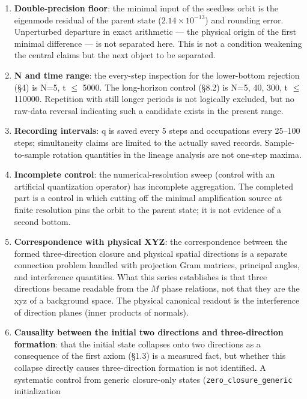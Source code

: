 \documentclass[
  a4paper,
]{article}
\providecommand{\tightlist}{%
  \setlength{\itemsep}{0pt}\setlength{\parskip}{0pt}}
\begin{document}
\begin{enumerate}
\def\labelenumi{\arabic{enumi}.}
\tightlist
\item
  \textbf{Double-precision floor}: the minimal input of the seedless
  orbit is the eigenmode residual of the parent state
  (\(2.14\times10^{-13}\)) and rounding error. Unperturbed departure in
  exact arithmetic --- the physical origin of the first minimal
  difference --- is not separated here. This is not a condition
  weakening the central claims but the next object to be separated.
\item
  \textbf{N and time range}: the every-step inspection for the
  lower-bottom rejection (§4) is N=5, t \(\le\) 5000. The long-horizon
  control (§8.2) is N=5, 40, 300, t \(\le\) 110000. Repetition with
  still longer periods is not logically excluded, but no raw-data
  reversal indicating such a candidate exists in the present range.
\item
  \textbf{Recording intervals}: q is saved every 5 steps and occupations
  every 25--100 steps; simultaneity claims are limited to the actually
  saved records. Sample-to-sample rotation quantities in the lineage
  analysis are not one-step maxima.
\item
  \textbf{Incomplete control}: the numerical-resolution sweep (control
  with an artificial quantization operator) has incomplete aggregation.
  The completed part is a control in which cutting off the minimal
  amplification source at finite resolution pins the orbit to the parent
  state; it is not evidence of a second bottom.
\item
  \textbf{Correspondence with physical XYZ}: the correspondence between
  the formed three-direction closure and physical spatial directions is
  a separate connection problem handled with projection Gram matrices,
  principal angles, and interference quantities. What this series
  establishes is that three directions became readable from the \(M\)
  phase relations, not that they are the xyz of a background space. The
  physical canonical readout is the interference of direction planes
  (inner products of normals).
\item
  \textbf{Causality between the initial two directions and
  three-direction formation}: that the initial state collapses onto two
  directions as a consequence of the first axiom (§1.3) is a measured
  fact, but whether this collapse directly causes three-direction
  formation is not identified. A systematic control from generic
  closure-only states (\texttt{zero\_closure\_generic} initialization

\end{enumerate}
\end{document}
